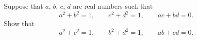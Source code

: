 Suppose that $a$, $b$, $c$, $d$ are real numbers such that
\[
a^2+b^2=1,\qquad c^2+d^2=1,\qquad ac+bd=0 .
\]
Show that
\[
a^2+c^2=1,\qquad b^2+d^2=1,\qquad ab+cd=0 .
\]

